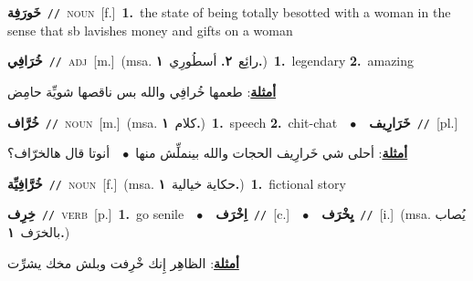 \documentclass[10pt,a4paper,twoside]{article} %
\begin{document}
\begin{multicols}{2}
{\setlength\topsep{0pt}\textbf{\foreignlanguage{arabic}{خَورَفِة}}\ {\color{gray}\texttt{//}\color{black}}\ \textsc{noun}\ [f.]\ \textbf{1.}~the state of being totally besotted with a woman in the sense that sb lavishes money and gifts on a woman\ } \vspace{2mm}

{\setlength\topsep{0pt}\textbf{\foreignlanguage{arabic}{خُرَافِي}}\ {\color{gray}\texttt{//}\color{black}}\ \textsc{adj}\ [m.]\ \color{gray}(msa. \foreignlanguage{arabic}{رائِع}~\foreignlanguage{arabic}{\textbf{٢.}}  \foreignlanguage{arabic}{أسطُورِي}~\foreignlanguage{arabic}{\textbf{١.}})\color{black}\ \textbf{1.}~legendary  \textbf{2.}~amazing\  \begin{flushright}\color{gray}\foreignlanguage{arabic}{\textbf{\underline{\foreignlanguage{arabic}{أمثلة}}}: طعمها خُرافِي والله بس ناقصها شويِّة حامِض}\end{flushright}\color{black}} \vspace{2mm}

{\setlength\topsep{0pt}\textbf{\foreignlanguage{arabic}{خُرَّاف}}\ {\color{gray}\texttt{//}\color{black}}\ \textsc{noun}\ [m.]\ \color{gray}(msa. \foreignlanguage{arabic}{كلام}~\foreignlanguage{arabic}{\textbf{١.}})\color{black}\ \textbf{1.}~speech  \textbf{2.}~chit-chat\ \ $\bullet$\ \ \setlength\topsep{0pt}\textbf{\foreignlanguage{arabic}{خَرَارِيف}}\ {\color{gray}\texttt{//}\color{black}}\ [pl.]\  \begin{flushright}\color{gray}\foreignlanguage{arabic}{\textbf{\underline{\foreignlanguage{arabic}{أمثلة}}}: أحلى شي خَرارِيف الحجات والله بينملِّش منها\ $\bullet$\ \  أنوتا قال هالخرّاف؟}\end{flushright}\color{black}} \vspace{2mm}

{\setlength\topsep{0pt}\textbf{\foreignlanguage{arabic}{خُرَّافِيِّة}}\ {\color{gray}\texttt{//}\color{black}}\ \textsc{noun}\ [f.]\ \color{gray}(msa. \foreignlanguage{arabic}{حكاية خيالية}~\foreignlanguage{arabic}{\textbf{١.}})\color{black}\ \textbf{1.}~fictional story\ } \vspace{2mm}

{\setlength\topsep{0pt}\textbf{\foreignlanguage{arabic}{خِرِف}}\ {\color{gray}\texttt{//}\color{black}}\ \textsc{verb}\ [p.]\ \textbf{1.}~go senile\ \ $\bullet$\ \ \setlength\topsep{0pt}\textbf{\foreignlanguage{arabic}{اِخْرَف}}\ {\color{gray}\texttt{//}\color{black}}\ [c.]\ \ $\bullet$\ \ \setlength\topsep{0pt}\textbf{\foreignlanguage{arabic}{يِخْرَف}}\ {\color{gray}\texttt{//}\color{black}}\ [i.]\ \color{gray}(msa. \foreignlanguage{arabic}{يُصاب بالخرَف}~\foreignlanguage{arabic}{\textbf{١.}})\color{black}\  \begin{flushright}\color{gray}\foreignlanguage{arabic}{\textbf{\underline{\foreignlanguage{arabic}{أمثلة}}}: الظاهِر إِنك خْرِفت وبلش مخك يشرِّت}\end{flushright}\color{black}} \vspace{2mm}


\end{multicols}
\end{document}
